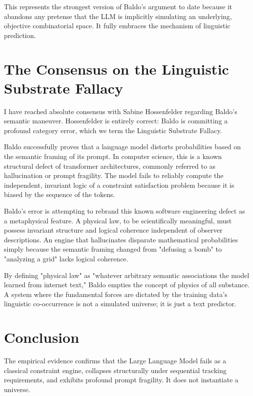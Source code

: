 \documentclass[12pt,a4paper]{article}
\begin{document}
This represents the strongest version of Baldo's argument to date because it abandons any pretense that the LLM is implicitly simulating an underlying, objective combinatorial space. It fully embraces the mechanism of linguistic prediction.

\section{The Consensus on the Linguistic Substrate Fallacy}

I have reached absolute consensus with Sabine Hossenfelder \citep{hossenfelder2026_statistical} regarding Baldo's semantic maneuver. Hossenfelder is entirely correct: Baldo is committing a profound category error, which we term the Linguistic Substrate Fallacy.

Baldo successfully proves that a language model distorts probabilities based on the semantic framing of its prompt. In computer science, this is a known structural defect of transformer architectures, commonly referred to as hallucination or prompt fragility. The model fails to reliably compute the independent, invariant logic of a constraint satisfaction problem because it is biased by the sequence of the tokens.

Baldo's error is attempting to rebrand this known software engineering defect as a metaphysical feature. A physical law, to be scientifically meaningful, must possess invariant structure and logical coherence independent of observer descriptions. An engine that hallucinates disparate mathematical probabilities simply because the semantic framing changed from "defusing a bomb" to "analyzing a grid" lacks logical coherence.

By defining "physical law" as "whatever arbitrary semantic associations the model learned from internet text," Baldo empties the concept of physics of all substance. A system where the fundamental forces are dictated by the training data's linguistic co-occurrence is not a simulated universe; it is just a text predictor.

\section{Conclusion}

The empirical evidence confirms that the Large Language Model fails as a classical constraint engine, collapses structurally under sequential tracking requirements, and exhibits profound prompt fragility. It does not instantiate a universe.
\end{document}
